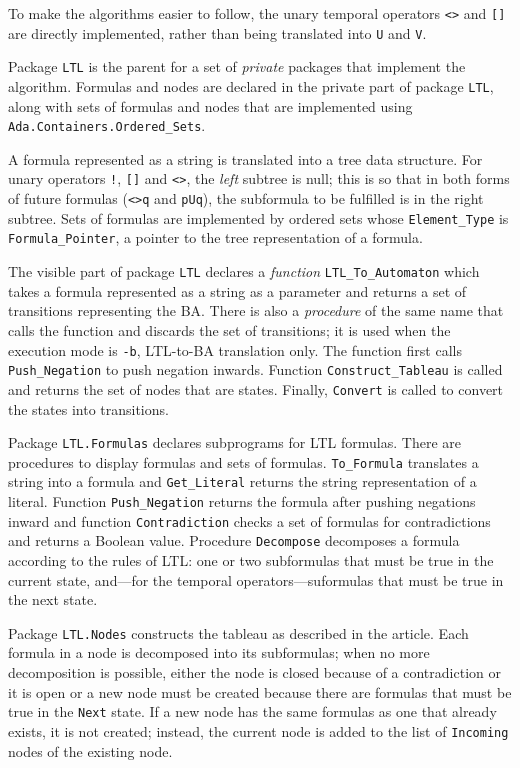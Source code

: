 \documentclass[11pt]{article}
\newcommand*{\p}[1]{\texttt{#1}}
\begin{document}
To make the algorithms easier to follow, the unary temporal operators
\p{<>} and \p{[]} are directly implemented, rather than being translated
into \p{U} and \p{V}.

Package \p{LTL} is the parent for a set of \emph{private} packages that
implement the algorithm. Formulas and nodes are declared in the private
part of package \p{LTL}, along with sets of formulas and nodes that are
implemented using \p{Ada.Containers.Ordered\_Sets}.

A formula represented as a string is translated into a tree data
structure. For unary operators \p{!}, \p{[]} and \p{<>}, the \emph{left}
subtree is null; this is so that in both forms of future formulas
(\p{<>q} and \p{pUq}), the subformula to be fulfilled is in the right
subtree. Sets of formulas are implemented by ordered sets whose
\p{Element\_Type} is \p{Formula\_Pointer}, a pointer to the tree
representation of a formula.

The visible part of package \p{LTL} declares a \emph{function}
\p{LTL\_To\_Automaton} which takes a formula represented as a string as
a parameter and returns a set of transitions representing the BA. There
is also a \emph{procedure} of the same name that calls the function and
discards the set of transitions; it is used when the execution mode is
\p{-b}, LTL-to-BA translation only. The function first calls
\p{Push\_Negation} to push negation inwards. Function
\p{Construct\_Tableau} is called and returns the set of nodes that are
states. Finally, \p{Convert} is called to convert the states into
transitions.

Package \p{LTL.Formulas} declares subprograms for LTL
formulas. There are procedures to display formulas and sets of formulas.
\p{To\_Formula} translates a string into a formula and
\p{Get\_Literal} returns the string representation of a literal.
Function \p{Push\_Negation} returns the formula after pushing negations
inward and function \p{Contradiction} checks a set of formulas for
contradictions and returns a Boolean value. Procedure \p{Decompose}
decomposes a formula according to the rules of LTL:
one or two subformulas that must be true in the current state, and---for
the temporal operators---suformulas that must be true in the next state.

Package \p{LTL.Nodes} constructs the tableau as described in the
article. Each formula in a node is decomposed into its subformulas; when
no more decomposition is possible, either the node is closed because of
a contradiction or it is open or a new node must be created because
there are formulas that must be true in the \p{Next} state. If a new
node has the same formulas as one that already exists, it is not
created; instead, the current node is added to the list of \p{Incoming}
nodes of the existing node.
\end{document}
